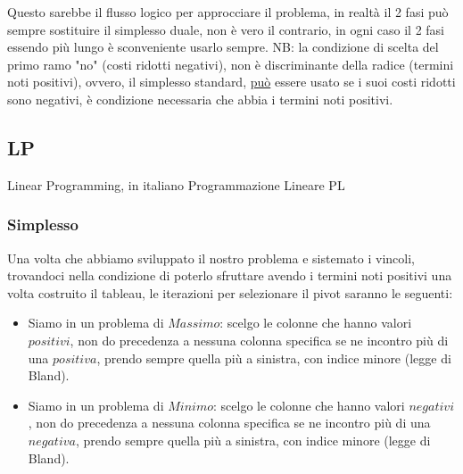 \documentclass{article}
\begin{document}
\begin{center}
\end{center}

Questo sarebbe il flusso logico per approcciare il problema, in realtà il 2 fasi può sempre sostituire il simplesso duale, non è vero il contrario, in ogni caso il 2 fasi essendo più lungo è sconveniente usarlo sempre.
NB: la condizione di scelta del primo ramo "no" (costi ridotti negativi), non è discriminante della radice (termini noti positivi), ovvero, il simplesso standard, \underline{può} essere usato se i suoi costi ridotti sono negativi, è condizione necessaria che abbia i termini noti positivi.
\subsection{LP}
Linear Programming, in italiano Programmazione Lineare PL
\subsubsection{Simplesso}
Una volta che abbiamo sviluppato il nostro problema e sistemato i vincoli, trovandoci nella condizione di poterlo sfruttare avendo i termini noti positivi una volta costruito il tableau, le iterazioni per selezionare il pivot saranno le seguenti:\\
\begin{itemize}
\item Siamo in un problema di $Massimo$: scelgo le colonne che hanno valori $positivi$, non do precedenza a nessuna colonna specifica se ne incontro più di una $positiva$, prendo sempre quella più a sinistra, con indice minore (legge di Bland).


\item Siamo in un problema di $Minimo$: scelgo le colonne che hanno valori $negativi$, non do precedenza a nessuna colonna specifica se ne incontro più di una $negativa$, prendo sempre quella più a sinistra, con indice minore (legge di Bland).

\end{itemize}
\end{document}

